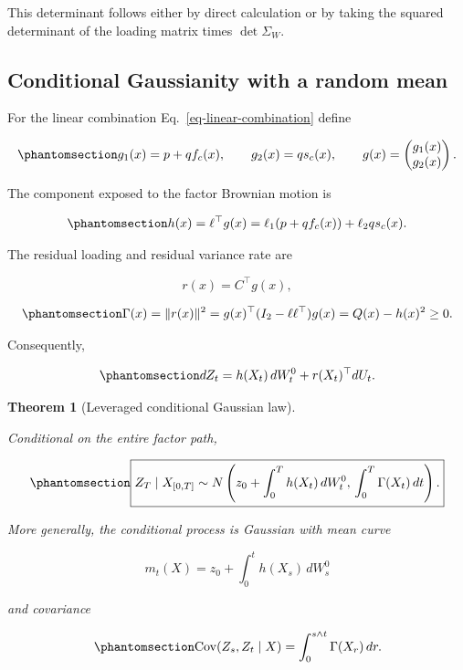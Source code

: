 \documentclass[
  english,
  11pt,
  letterpaper,
  DIV=11,
  numbers=noendperiod]{scrartcl}
\theoremstyle{plain}
\newtheorem{theorem}{Theorem}[section]
\theoremstyle{plain}
\theoremstyle{plain}
\theoremstyle{plain}
\theoremstyle{remark}
\begin{document}
This determinant follows either by direct calculation or by taking the
squared determinant of the loading matrix times \(\det\Sigma_W\).

\subsection{Conditional Gaussianity with a random
mean}\label{conditional-gaussianity-with-a-random-mean}

For the linear combination Eq.~\ref{eq-linear-combination} define

\begin{equation}\protect\phantomsection\label{eq-g-loadings}{
g_1(x)=p+qf_c(x),
\qquad
g_2(x)=q s_c(x),
\qquad
g(x)=
\begin{pmatrix}g_1(x)\\g_2(x)\end{pmatrix}.
}\end{equation}

The component exposed to the factor Brownian motion is

\begin{equation}\protect\phantomsection\label{eq-common-loading}{
h(x)=\ell^\top g(x)
=\ell_1(p+qf_c(x))+\ell_2q s_c(x).
}\end{equation}

The residual loading and residual variance rate are

\[
r(x)=C^\top g(x),
\]

\begin{equation}\protect\phantomsection\label{eq-residual-variance}{
\Gamma(x)=\|r(x)\|^2
=g(x)^\top(I_2-\ell\ell^\top)g(x)
=Q(x)-h(x)^2\ge0.
}\end{equation}

Consequently,

\begin{equation}\protect\phantomsection\label{eq-leveraged-Z}{
dZ_t=h(X_t)\,dW_t^0+r(X_t)^\top dU_t.
}\end{equation}

\begin{theorem}[Leveraged conditional Gaussian
law]\protect\hypertarget{thm-conditional-leverage}{}\label{thm-conditional-leverage}

Conditional on the entire factor path,

\begin{equation}\protect\phantomsection\label{eq-leveraged-conditional-terminal}{
\boxed{
Z_T\mid X_{[0,T]}
\sim
N\left(
z_0+\int_0^Th(X_t)\,dW_t^0,\,
\int_0^T\Gamma(X_t)\,dt
\right).
}
}\end{equation}

More generally, the conditional process is Gaussian with mean curve

\[
m_t(X)=z_0+\int_0^th(X_s)\,dW_s^0
\]

and covariance

\begin{equation}\protect\phantomsection\label{eq-leveraged-conditional-covariance}{
\operatorname{Cov}(Z_s,Z_t\mid X)
=\int_0^{s\wedge t}\Gamma(X_r)\,dr.
}\end{equation}

\end{theorem}
\end{document}
